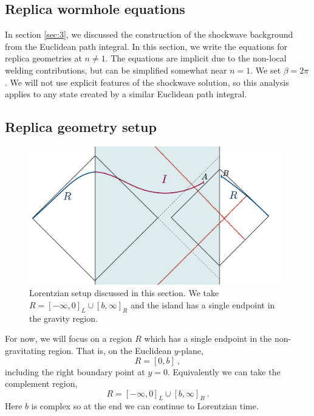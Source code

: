 \documentclass[12pt]{article}
\newcommand{\be}{\begin{equation}}
\newcommand{\ee}{\end{equation}}
\def\be{\begin{eqnarray}}
\def\ee{\end{eqnarray}}
\def\be{\begin{equation}}
\def\ee{\end{equation}}
\numberwithin{equation}{section}
\def\be{\begin{equation}}
\def\ee{\end{equation}}
\def \be {\begin{equation}}
\def \ee {\end{equation}}
\begin{document}
\begin{spacing}{1.1}
 



\section{Replica wormhole equations}\label{sec:repworm}



\newcommand{\M}{\mathcal{M}}

In section \ref{sec:3}, we discussed the construction of the shockwave background from the Euclidean path integral. In this section, we write the equations for replica geometries at $n\neq 1$. The equations are implicit due to the non-local welding contributions, but can be simplified somewhat near $n=1$. We set $\beta = 2\pi$. We will not use explicit features of the shockwave solution, so this analysis applies to any state created by a similar Euclidean path integral.



\subsection{Replica geometry setup}
\begin{figure}
   \begin{center}
  \includegraphics[height=6cm]{figures/Lorentzian_singleinterval.png}
  \caption{Lorentzian setup discussed in this section. We take $R=[-\infty,0 ]_L\cup [b,\infty]_R$ and the island has a single endpoint in the gravity region.
  \label{fig:Lorentzian_singleinterval}
  }
  \end{center}
\end{figure}
For now, we will focus on a region $R$ which has a single endpoint in the non-gravitating region. That is, on the Euclidean $y$-plane, 
\be
R = [0,b] \ ,
\ee
including the right boundary point at $y=0$. Equivalently we can take the complement region,
\be
R=[-\infty,0 ]_L\cup [b,\infty]_R \ .
\ee
Here $b$ is complex so at the end we can continue to Lorentzian time. 


\end{spacing}
\end{document}
